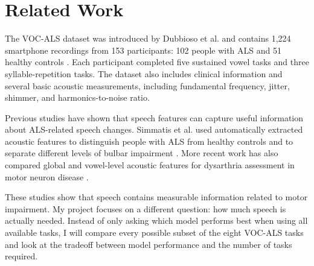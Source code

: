 \section{Related Work}

The VOC-ALS dataset was introduced by Dubbioso et al. and contains 1,224 smartphone recordings from 153 participants: 102 people with ALS and 51 healthy controls \cite{dubbioso2024vocals}. Each participant completed five sustained vowel tasks and three syllable-repetition tasks. The dataset also includes clinical information and several basic acoustic measurements, including fundamental frequency, jitter, shimmer, and harmonics-to-noise ratio.

Previous studies have shown that speech features can capture useful information about ALS-related speech changes. Simmatis et al. used automatically extracted acoustic features to distinguish people with ALS from healthy controls and to separate different levels of bulbar impairment \cite{simmatis2024acoustic}. More recent work has also compared global and vowel-level acoustic features for dysarthria assessment in motor neuron disease \cite{attia2025global}.

These studies show that speech contains measurable information related to motor impairment. My project focuses on a different question: how much speech is actually needed. Instead of only asking which model performs best when using all available tasks, I will compare every possible subset of the eight VOC-ALS tasks and look at the tradeoff between model performance and the number of tasks required.

